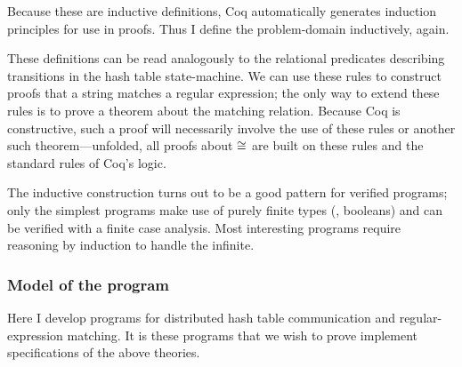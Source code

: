 Because these are inductive definitions, Coq automatically generates induction
principles for use in proofs. Thus I define the problem-domain inductively,
again.

These definitions can be read analogously to the relational predicates
describing transitions in the hash table state-machine. We can use these rules
to construct proofs that a string matches a regular expression; the only way to
extend these rules is to prove a theorem about the matching relation. Because
Coq is constructive, such a proof will necessarily involve the use of these
rules or another such theorem---unfolded, all proofs about \(\mathrel{\cong}\) are built
on these rules and the standard rules of Coq's logic.

The inductive construction turns out to be a good pattern for verified programs;
only the simplest programs make use of purely finite types (\eg, booleans) and
can be verified with a finite case analysis. Most interesting programs require
reasoning by induction to handle the infinite.

\subsubsection{Model of the program}\label{S:ex_program}

Here I develop programs for distributed hash table communication and
regular-expression matching. It is these programs that we wish to prove
implement specifications of the above theories.

